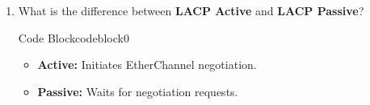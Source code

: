 \documentclass[a4paper]{article}
\begin{document}
\begin{enumerate}
	\item What is the difference between \textbf{LACP Active} and \textbf{LACP Passive}?


	      \begin{ocg}{Code Block}{codeblock}{0}

		      \vspace{0.5cm}

		      \begin{tcolorbox}
			      \begin{itemize}
				      \item \textbf{Active:} Initiates EtherChannel negotiation.
				      \item \textbf{Passive:} Waits for negotiation requests.
			      \end{itemize}
		      \end{tcolorbox}
		      \vspace{0.5cm}
	      \end{ocg}

\end{enumerate}
\end{document}
